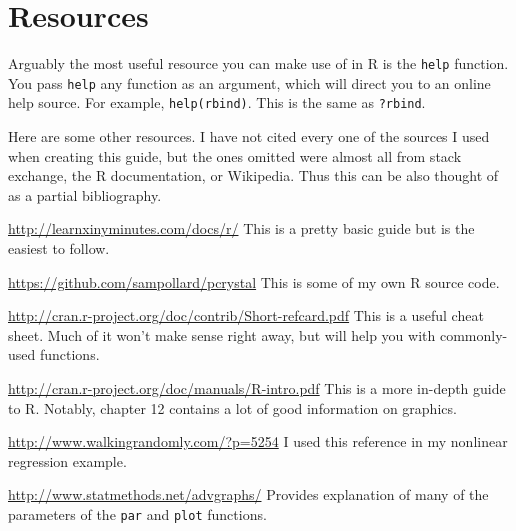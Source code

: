 \documentclass[12pt]{article}
\theoremstyle{remark}
\begin{document}
\clearpage
\section{Resources}
Arguably the most useful resource you can make use of in R is the \verb|help| function. You pass \verb|help| any function as an argument, which will direct you to an online help source. For example, \verb|help(rbind)|. This is the same as \verb|?rbind|.

Here are some other resources. I have not cited every one of the sources I used when creating this guide, but the ones omitted were almost all from stack exchange, the R documentation, or Wikipedia. Thus this can be also thought of as a partial bibliography.
\begingroup
\renewcommand{\section}[2]{}%
\begin{thebibliography}{}
		\url{http://learnxinyminutes.com/docs/r/}
		This is a pretty basic guide but is the easiest to follow.
		
		\url{https://github.com/sampollard/pcrystal}
		This is some of my own R source code.
		
		\url{http://cran.r-project.org/doc/contrib/Short-refcard.pdf}
		This is a useful cheat sheet. Much of it won't make sense right away, but will help you with commonly-used functions.
		
		\url{http://cran.r-project.org/doc/manuals/R-intro.pdf}
		This is a more in-depth guide to R. Notably, chapter 12 contains a lot of good information on graphics.
	
		\url{http://www.walkingrandomly.com/?p=5254}
		I used this reference in my nonlinear regression example.
		
		\url{http://www.statmethods.net/advgraphs/} Provides explanation of many of the parameters of the \verb|par| and \verb|plot| functions.
\end{thebibliography}
\endgroup
\end{document}
